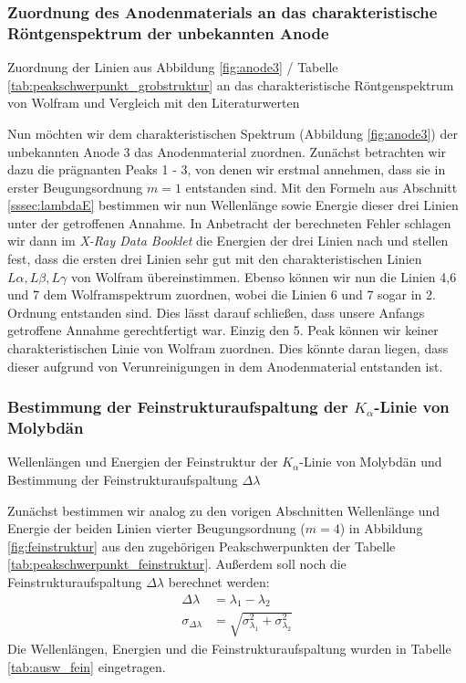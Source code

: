 \documentclass[11pt, a4paper]{article}
\begin{document}
\subsubsection{Zuordnung des Anodenmaterials an das charakteristische Röntgenspektrum der unbekannten Anode}
\begin{table}[h]
\centering

\caption{Zuordnung der Linien aus Abbildung \ref{fig:anode3} / Tabelle \ref{tab:peakschwerpunkt_grobstruktur} an das charakteristische Röntgenspektrum von Wolfram und Vergleich mit den Literaturwerten}
\label{tab:ausw_grob}
\end{table}
Nun möchten wir dem charakteristischen Spektrum (Abbildung \ref{fig:anode3}) der unbekannten Anode 3 das Anodenmaterial zuordnen.
Zunächst betrachten wir dazu die prägnanten Peaks 1 - 3, von denen wir erstmal annehmen, dass sie in erster Beugungsordnung $m = 1$ entstanden sind.
Mit den Formeln aus Abschnitt \ref{sssec:lambdaE} bestimmen wir nun Wellenlänge sowie Energie dieser drei Linien unter der getroffenen Annahme.
In Anbetracht der berechneten Fehler schlagen wir dann im \emph{X-Ray Data Booklet} \cite{booklet} die Energien der drei Linien nach und stellen fest, dass die ersten drei Linien sehr gut mit den charakteristischen Linien $L\alpha, L\beta, L\gamma$ von Wolfram übereinstimmen.
Ebenso können wir nun die Linien 4,6 und 7 dem Wolframspektrum zuordnen, wobei die Linien 6 und 7 sogar in 2. Ordnung entstanden sind.
Dies lässt darauf schließen, dass unsere Anfangs getroffene Annahme gerechtfertigt war.
Einzig den 5. Peak können wir keiner charakteristischen Linie von Wolfram zuordnen.
Dies könnte daran liegen, dass dieser aufgrund von Verunreinigungen in dem Anodenmaterial entstanden ist.

\subsubsection{Bestimmung der Feinstrukturaufspaltung der $K_\alpha$-Linie von Molybdän}
\begin{table}[h]
\centering
\resizebox{\columnwidth}{!}{%
}
\caption{Wellenlängen und Energien der Feinstruktur der $K_\alpha$-Linie von Molybdän und Bestimmung der Feinstrukturaufspaltung $\Delta \lambda$}
\label{tab:ausw_fein}
\end{table}
Zunächst bestimmen wir analog zu den vorigen Abschnitten Wellenlänge und Energie der beiden Linien vierter Beugungsordnung ($m=4$) in Abbildung \ref{fig:feinstruktur} aus den zugehörigen Peakschwerpunkten der Tabelle \ref{tab:peakschwerpunkt_feinstruktur}.
Außerdem soll noch die Feinstrukturaufspaltung $\Delta \lambda$ berechnet werden:
\begin{align}
  \Delta \lambda &= \lambda_1 - \lambda_2 \\
  \sigma_{\Delta \lambda} &= \sqrt{\sigma_{\lambda_1}^2 + \sigma_{\lambda_2}^2}
\end{align}
Die Wellenlängen, Energien und die Feinstrukturaufspaltung wurden in Tabelle \ref{tab:ausw_fein} eingetragen.
\end{document}
